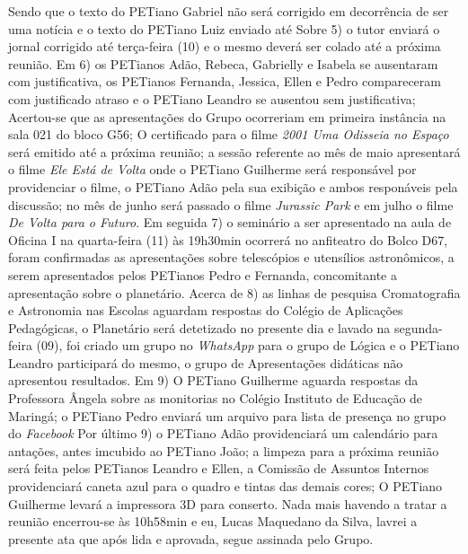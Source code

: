 \documentclass[a4paper,12pt]{report}
\begin{document}
\noindent Sendo que o texto do PETiano Gabriel não será corrigido em decorrência de ser uma notícia e o texto do PETiano Luiz enviado até
Sobre 5) o tutor enviará o jornal corrigido até terça-feira (10) e o mesmo deverá ser colado até a próxima reunião.
Em 6) os PETianos Adão, Rebeca, Gabrielly e Isabela se ausentaram com justificativa, os PETianos Fernanda, Jessica, Ellen e Pedro compareceram com justificado atraso e o PETiano Leandro se ausentou sem justificativa; Acertou-se que as apresentações do Grupo ocorreriam em primeira instância na sala 021 do bloco G56; O certificado para o filme {\it 2001 Uma Odisseia no Espaço} será emitido até a próxima reunião; a sessão referente ao mês de maio apresentará o filme {\it Ele Está de Volta} onde o PETiano Guilherme será responsável por providenciar o filme, o PETiano Adão pela sua exibição e ambos responáveis pela discussão; no mês de junho será passado o filme {\it Jurassic Park} e em julho o filme {\it De Volta para o Futuro}.  
Em seguida 7) o seminário a ser apresentado na aula de Oficina I na quarta-feira (11) às 19h30min ocorrerá no anfiteatro do Bolco D67, foram confirmadas as apresentações sobre telescópios e utensílios astronômicos, a serem apresentados pelos PETianos Pedro e Fernanda, concomitante a apresentação sobre o planetário.
Acerca de 8) as linhas de pesquisa  Cromatografia e Astronomia nas Escolas aguardam respostas do Colégio de Aplicações Pedagógicas, o Planetário  será detetizado no presente dia e lavado na segunda-feira (09), foi criado um grupo no {\it WhatsApp} para o grupo de Lógica e o PETiano Leandro participará do mesmo, o grupo de Apresentações didáticas não apresentou resultados.
Em 9) O PETiano Guilherme aguarda respostas da Professora Ângela sobre as monitorias no Colégio Instituto de Educação de Maringá; o PETiano Pedro enviará um arquivo para lista de presença no grupo do {\it Facebook} 
Por último 9) o PETiano Adão providenciará um calendário para antações, antes imcubido ao PETiano João; a limpeza para a próxima reunião será feita pelos PETianos Leandro e Ellen, a Comissão de Assuntos Internos providenciará caneta azul para o quadro e tintas das demais cores; O PETiano Guilherme levará a impressora 3D para conserto.
Nada mais havendo a tratar a reunião encerrou-se às 10h58min e eu, Lucas Maquedano da Silva, lavrei a presente ata que após lida e aprovada, segue assinada pelo Grupo. 
 
 
\vfill 
\end{document}
